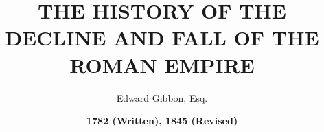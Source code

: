 \pretitle{\begin{center}\Huge\bfseries}
\title{THE HISTORY OF THE DECLINE AND FALL OF THE ROMAN EMPIRE}
\posttitle{\end{center}}
\preauthor{\begin{center}\large\bfseries}
\author{Edward Gibbon, Esq.}
\date{\bfseries\normalsize 1782 (Written), 1845 (Revised)}

\maketitle
